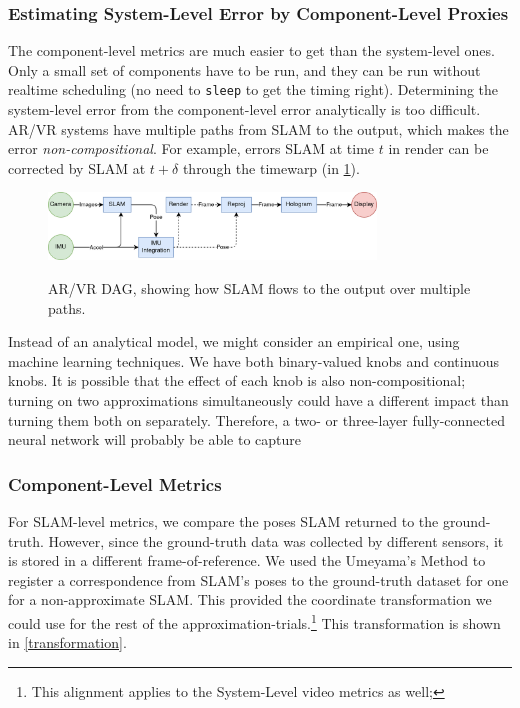 \subsubsection{Estimating System-Level Error by Component-Level Proxies}

The component-level metrics are much easier to get than the system-level ones.
Only a small set of components have to be run, and they can be run without realtime scheduling (no need to \verb+sleep+ to get the timing right).
Determining the system-level error from the component-level error analytically is too difficult.
AR/VR systems have multiple paths from SLAM to the output, which makes the error \textit{non-compositional}.
For example, errors SLAM at time \(t\) in render can be corrected by SLAM at \(t+\delta\) through the timewarp (in \cref{dag}).

\begin{figure}
\caption{AR/VR DAG, showing how SLAM flows to the output over multiple paths.}
\includegraphics[height=1.8cm]{dag.png}
\label{dag}
\end{figure}

Instead of an analytical model, we might consider an empirical one, using machine learning techniques.
We have both binary-valued knobs and continuous knobs.
It is possible that the effect of each knob is also non-compositional;
turning on two approximations simultaneously could have a different impact than turning them both on separately.
Therefore, a two- or three-layer fully-connected neural network will probably be able to capture 

\subsubsection{Component-Level Metrics}

For SLAM-level metrics, we compare the poses SLAM returned to the ground-truth.
However, since the ground-truth data was collected by different sensors, it is stored in a different frame-of-reference.
We used the Umeyama's Method to register a correspondence from SLAM's poses to the ground-truth dataset for one for a non-approximate SLAM\cite{88573}.
This provided the coordinate transformation we could use for the rest of the approximation-trials.\footnote{This alignment applies to the System-Level video metrics as well; }
This transformation is shown in \cref{transformation}.

